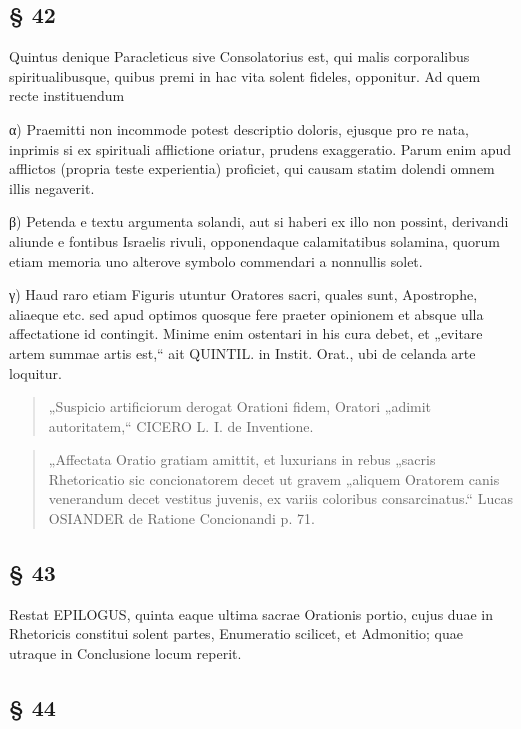 \subsection{§ 42}

Quintus denique Paracleticus sive Consolatorius est, qui malis corporalibus spiritualibusque, quibus premi in hac vita solent fideles, opponitur. Ad quem recte instituendum

α) Praemitti non incommode potest descriptio doloris, ejusque pro re nata, inprimis si ex spirituali afflictione oriatur, prudens exaggeratio. Parum enim apud afflictos (propria teste experientia) proficiet, qui causam statim dolendi omnem illis negaverit.

β) Petenda e textu argumenta solandi, aut si haberi ex illo non possint, derivandi aliunde e fontibus Israelis rivuli, opponendaque calamitatibus solamina, quorum etiam memoria uno alterove symbolo commendari a nonnullis solet.

γ) Haud raro etiam Figuris utuntur Oratores sacri, quales sunt, Apostrophe, aliaeque etc. sed apud optimos quosque fere praeter opinionem et absque ulla affectatione id contingit. Minime enim ostentari in his cura debet, et „evitare artem summae artis est,“ ait QUINTIL. in Instit. Orat., ubi de celanda arte loquitur.

\begin{quote}
„Suspicio artificiorum derogat Orationi fidem, Oratori „adimit autoritatem,“ CICERO L. I. de Inventione.
\end{quote}

\begin{quote}
„Affectata Oratio gratiam amittit, et luxurians in rebus „sacris Rhetoricatio sic concionatorem decet ut gravem „aliquem Oratorem canis venerandum decet vestitus juvenis, ex variis coloribus consarcinatus.“ Lucas OSIANDER de Ratione Concionandi p. 71.
\end{quote}

\subsection{§ 43}

Restat EPILOGUS, quinta eaque ultima sacrae Orationis portio, cujus duae in Rhetoricis constitui solent partes, Enumeratio scilicet, et Admonitio; quae utraque in Conclusione locum reperit.

\subsection{§ 44}

